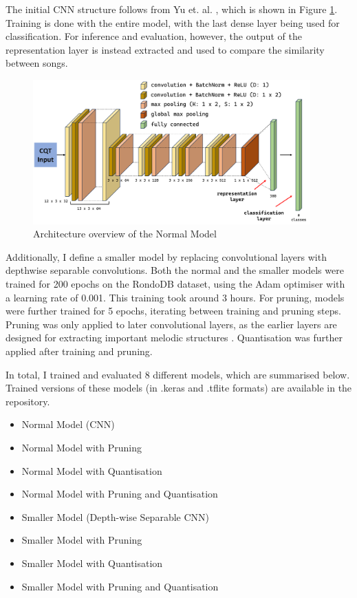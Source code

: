\documentclass{article}
\begin{document}
The initial CNN structure follows from Yu et. al. \cite{Yu2020}, which is shown in Figure \ref{fig:cnn-architecture}. Training is done with the entire model, with the last dense layer being used for classification. For inference and evaluation, however, the output of the representation layer is instead extracted and used to compare the similarity between songs.
\begin{figure}[h]
    \centering
    \includegraphics[width=0.95\textwidth]{figures/architecture_diagram_final.png}
    \caption{Architecture overview of the Normal Model}
    \label{fig:cnn-architecture}
\end{figure}

Additionally, I define a smaller model by replacing convolutional layers with depthwise separable convolutions. Both the normal and the smaller models were trained for 200 epochs on the RondoDB dataset, using the Adam optimiser with a learning rate of 0.001. This training took around 3 hours. For pruning, models were further trained for 5 epochs, iterating between training and pruning steps. Pruning was only applied to later convolutional layers, as the earlier layers are designed for extracting important melodic structures \cite{Yu2020}. Quantisation was further applied after training and pruning.

In total, I trained and evaluated 8 different models, which are summarised below. Trained versions of these models (in .keras and .tflite formats) are available in the repository.
\begin{multicols}{2}
\begin{itemize}
    \item Normal Model (CNN)
    \item Normal Model with Pruning
    \item Normal Model with Quantisation
    \item Normal Model with Pruning and Quantisation
    \item Smaller Model (Depth-wise Separable CNN)
    \item Smaller Model with Pruning
    \item Smaller Model with Quantisation
    \item Smaller Model with Pruning and Quantisation
\end{itemize}
\end{multicols}
\end{document}
